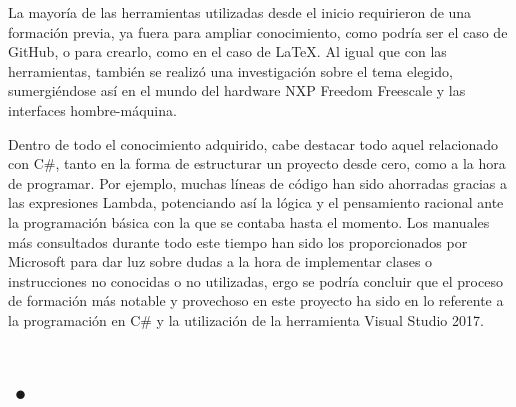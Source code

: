 La mayoría de las herramientas utilizadas desde el inicio requirieron de una formación previa, ya fuera para ampliar conocimiento, como podría ser el caso de GitHub, o para crearlo, como en el caso de \LaTeX. Al igual que con las herramientas, también se realizó una investigación sobre el tema elegido, sumergiéndose así en el mundo del hardware NXP Freedom Freescale y las interfaces hombre-máquina.

Dentro de todo el conocimiento adquirido, cabe destacar todo aquel relacionado con C\#, tanto en la forma de estructurar un proyecto desde cero, como a la hora de programar. Por ejemplo, muchas líneas de código han sido ahorradas gracias a las expresiones Lambda, potenciando así la lógica y el pensamiento racional ante la programación básica con la que se contaba hasta el momento. Los manuales más consultados durante todo este tiempo han sido los proporcionados por Microsoft para dar luz sobre dudas a la hora de implementar clases o instrucciones no conocidas o no utilizadas, ergo se podría concluir que el proceso de formación más notable y provechoso en este proyecto ha sido en lo referente a la programación en C\# y la utilización de la herramienta Visual Studio 2017.

\section{•}





